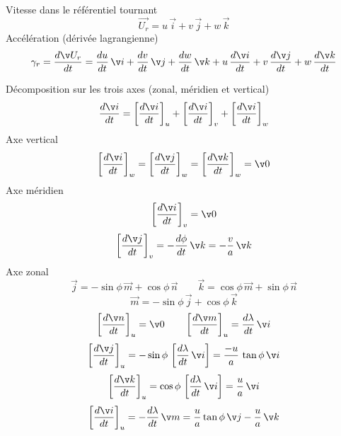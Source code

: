 \sk
Vitesse dans le référentiel tournant 
\[
\vec{U_r} = u\,\vec{i} + v\,\vec{j} + w\,\vec{k}
\]
\noindent Accélération (dérivée lagrangienne)
\[
\gamma_r = \derd{\vec{U_r}}{t}=\derd{u}{t}\,\vec{i}+\derd{v}{t}\,\vec{j}+\derd{w}{t}\,\vec{k} +u\,\derd{\vec{i}}{t}+v\,\derd{\vec{j}}{t}+w\,\derd{\vec{k}}{t}
\]


\sk
Décomposition sur les trois axes (zonal, méridien et vertical)
\[
\derd{\vec{i}}{t} = \left[ \derd{\vec{i}}{t} \right]_u + \left[ \derd{\vec{i}}{t} \right]_v + \left[ \derd{\vec{i}}{t} \right]_w
\]
\noindent Axe vertical
\[
\left[ \derd{\vec{i}}{t} \right]_w = \left[ \derd{\vec{j}}{t} \right]_w = \left[ \derd{\vec{k}}{t} \right]_w = \vec{0}
\]
\noindent Axe méridien
\[
\left[ \derd{\vec{i}}{t} \right]_v = \vec{0}
\]
\[
\left[ \derd{\vec{j}}{t} \right]_v = - \derd{\phi}{t} \, \vec{k} = - \dfrac{v}{a} \, \vec{k}
\]
\noindent Axe zonal
\[
\vec{j} = -\sin\phi \, \vec{m} + \cos\phi \, \vec{n} \qquad \vec{k} =  \cos\phi \, \vec{m} + \sin\phi \, \vec{n}
\]
\[
\vec{m} = -\sin\phi \, \vec{j} + \cos\phi \, \vec{k}
\]
\[
\left[ \derd{\vec{n}}{t} \right]_u = \vec{0} \qquad \left[ \derd{\vec{m}}{t} \right]_u = \derd{\lambda}{t} \, \vec{i}
\]
\[
\left[ \derd{\vec{j}}{t} \right]_u = -\sin\phi \, \left[ \derd{\lambda}{t} \, \vec{i} \right] = \dfrac{-u}{a} \, \tan\phi \, \vec{i}
\]
\[
\left[ \derd{\vec{k}}{t} \right]_u =  \cos\phi \, \left[ \derd{\lambda}{t} \, \vec{i} \right] = \dfrac{u}{a} \, \vec{i}
\]
\[
\left[ \derd{\vec{i}}{t} \right]_u = - \derd{\lambda}{t} \, \vec{m} = \dfrac{u}{a} \tan\phi \, \vec{j} - \dfrac{u}{a} \,\vec{k}
\]


